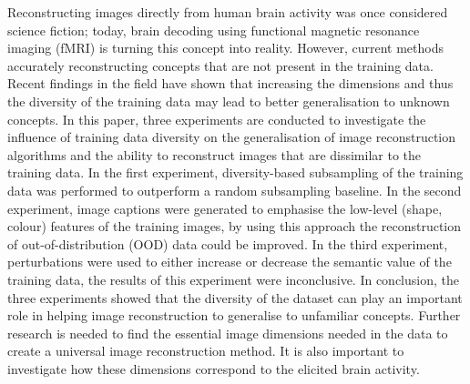 %
%

\noindent{}Reconstructing images directly from human brain activity was once considered science fiction; today, brain decoding using functional magnetic resonance imaging (fMRI) is turning this concept into reality. However,  current methods  accurately reconstructing concepts that are not present in the training data. Recent findings in the field have shown that increasing the dimensions and thus the diversity of the training data may lead to better generalisation to unknown concepts. In this paper, three experiments are conducted to investigate the influence of training data diversity on the generalisation of image reconstruction algorithms and the ability to reconstruct images that are dissimilar to the training data. In the first experiment, diversity-based subsampling of the training data was performed to outperform a random subsampling baseline. In the second experiment, image captions were generated to emphasise the low-level (shape, colour) features of the training images, by using this approach the reconstruction of out-of-distribution (OOD) data could be improved. In the third experiment, perturbations were used to either increase or decrease the semantic value of the training data, the results of this experiment were inconclusive. In conclusion, the three experiments showed that the diversity of the dataset can play an important role in helping image reconstruction to generalise to unfamiliar concepts. Further research is needed to find the essential image dimensions needed in the data to create a universal image reconstruction method. It is also important to investigate how these dimensions correspond to the elicited brain activity.

